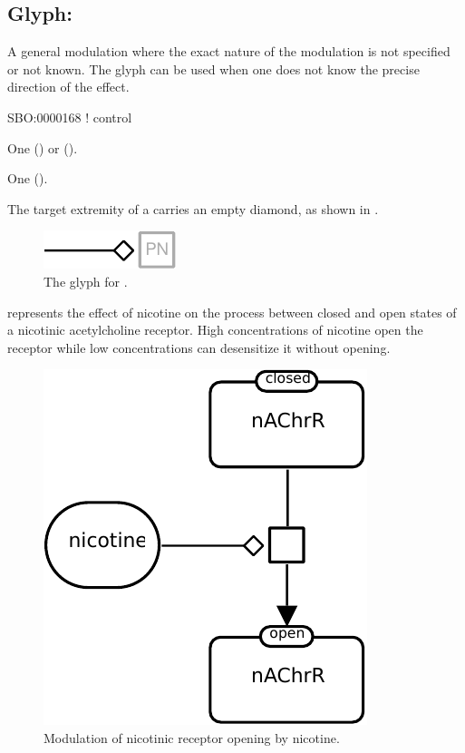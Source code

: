 \subsection{Glyph: }
\label{sec:modulation}

A general modulation where the exact nature of the modulation is not specified or not known.
The  glyph can be used when one does not know the precise direction of the effect.

\begin{glyphDescription}

\glyphSboTerm
SBO:0000168 ! control

\glyphOrigin
One  () or   ().

\glyphTarget
One  ().

\glyphSymbol
The target extremity of a  carries an empty diamond, as shown in .

\end{glyphDescription}

\begin{figure}[H]
  \centering
  \includegraphics{images/build/modulation.pdf}
  \caption{The \PD glyph for .}
  \label{fig:modulation}
\end{figure}

 represents the effect of nicotine on the process between closed and open states of a nicotinic acetylcholine receptor. High concentrations of nicotine open the receptor while low concentrations can desensitize it without opening.

\begin{figure}[H]
  \centering
  \includegraphics[scale = 0.8]{images/build/modulation_nAChR_example.pdf}
  \caption{Modulation of nicotinic receptor opening by nicotine.}
  \label{fig:modul-nico}
\end{figure}
